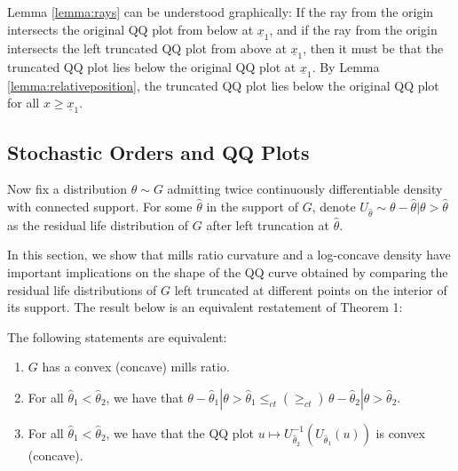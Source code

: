 \noindent Lemma \ref{lemma:rays} can be understood graphically: If the ray from the origin intersects the original QQ plot from below at $\underline{x}_1$, and if the ray from the origin intersects the left truncated QQ plot from above at $\underline{x}_1$, then it must be that the truncated QQ plot lies below the original QQ plot at $\underline{x}_1$. By Lemma \ref{lemma:relativeposition}, the truncated QQ plot lies below the original QQ plot for all $x\geq \underline{x}_1$.



\subsection{Stochastic Orders and QQ Plots}\label{section:stochorder_characterizations}

\noindent Now fix a distribution $\theta\sim G$ admitting twice continuously differentiable density with connected support. For some $\hat{\theta}$ in the support of $G$, denote $U_{\hat{\theta}}\sim \theta - \hat{\theta}|\theta>\hat{\theta}$ as the residual life distribution of $G$ after left truncation at $\hat{\theta}$. 

\noindent In this section, we show that mills ratio curvature and a log-concave density have important implications on the shape of the QQ curve obtained by comparing the residual life distributions of $G$ left truncated at different points on the interior of its support. The result below is an equivalent restatement of Theorem 1:

\begin{theorem}\label{theorem:millsratio_qq} The following statements are equivalent:
\vspace{-5pt}
\begin{enumerate}[label=(\arabic*),ref=\thelemma(\arabic*)]
   \item $G$ has a convex (concave) mills ratio. 
   \item For all $\hat{\theta}_1<\hat{\theta}_2$, we have that $\theta-\hat{\theta}_1|\theta>\hat{\theta}_1 \leq_{ct} (\geq_{ct})\,\theta-\hat{\theta}_2|\theta>\hat{\theta}_2$. 
   \item For all $\hat{\theta}_1<\hat{\theta}_2$, we have that the QQ plot $u\mapsto U_{\hat{\theta}_2}^{-1}(U_{\hat{\theta}_1}(u))$ is convex (concave). 
\end{enumerate}
\end{theorem}

